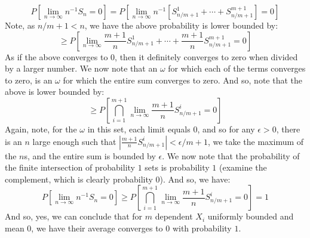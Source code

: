\documentclass[12pt,a4paper]{article}
\newcommand{\1}[1]{\mathbbm{1}\left\{ #1 \right\}}
\begin{document}
$$
	P\left[\lim_{n \to \infty} n^{-1}S_n = 0\right] =
	P\left[\lim_{n \to \infty} n^{-1}\left[S^1_{n/m+1} + \cdots + S^{m+1}_{n/m+1}\right] = 0\right]
$$
Note, as $n/m+1 < n$, we have the above probability is lower bounded by:
$$
	\geq
	P\left[\lim_{n \to \infty} \frac{m+1}{n}S^1_{n/m+1} + \cdots + \frac{m+1}{n}S^{m+1}_{n/m+1} = 0\right]
$$
As if the above converges to $0$, then it definitely converges to zero when divided by a larger number. We now note that an $\omega$ for which each of the terms converges to zero, is an $\omega$ for which the entire sum converges to zero. And so, note that the above is lower bounded by:
$$
	\geq
	P\left[\bigcap_{i=1}^{m+1} \lim_{n \to \infty} \frac{m+1}{n}S^i_{n/m+1} = 0\right]
$$
Again, note, for the $\omega$ in this set, each limit equals $0$, and so for any $\epsilon > 0$, there is an $n$ large enough such that $|\frac{m+1}{n}S^i_{n/m+1}| < \epsilon/m+1$, we take the maximum of the $n$s, and the entire sum is bounded by $\epsilon$. We now note that the probability of the finite intersection of probability $1$ sets is probability $1$ (examine the complement, which is clearly probability $0$). And so, we have:
$$
	P\left[\lim_{n \to \infty} n^{-1}S_n = 0\right] \geq
	P\left[\bigcap_{i=1}^{m+1} \lim_{n \to \infty} \frac{m+1}{n}S^i_{n/m+1} = 0\right] = 1
$$
And so, yes, we can conclude that for $m$ dependent $X_i$ uniformly bounded and mean $0$, we have their average converges to $0$ with probability $1$.
\end{document}
